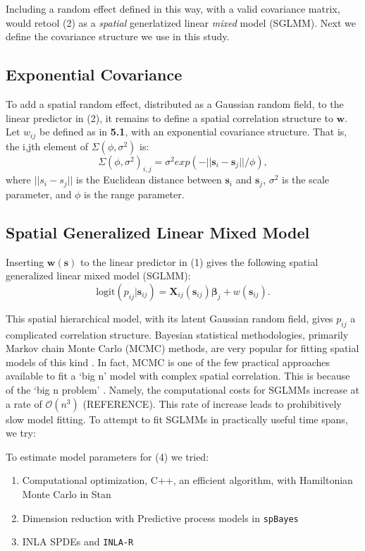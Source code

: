 \documentclass{article}
\begin{document}
Including a random effect defined in this way, with a valid covariance matrix, would retool (2) as a {\it spatial} generlatized linear {\it mixed} model (SGLMM). Next we define the covariance structure we use in this study.

\subsection{Exponential Covariance}
To add a spatial random effect, distributed as a Gaussian random field, to the linear predictor in (2), it remains to define a spatial correlation structure to $\pmb{w}$. Let $w_{ij}$ be defined as in {\bf 5.1}, with an exponential covariance structure. That is, the i,jth element of $\Sigma(\phi, \sigma^{2})$ is:
\begin{equation}
\Sigma(\phi, \sigma^{2})_{i,j} = \sigma^{2} exp(-||\pmb{s}_{i} - \pmb{s}_{j}||/\phi),
\end{equation}
where $||s_{i} - s_{j}||$ is the Euclidean distance between $\pmb{s}_{i}$ and $\pmb{s}_{j}$, $\sigma^{2}$ is the scale parameter, and $\phi$ is the range parameter.

\subsection{Spatial Generalized Linear Mixed Model}
Inserting $\pmb{w}(\pmb{s})$ to the linear predictor in (1) gives the following spatial generalized linear mixed model (SGLMM):
\begin{equation}
\text{logit}(p_{ij}|\pmb{s}_{ij}) = \pmb{X}_{ij}(\pmb{s}_{ij}) \pmb{\beta}_{j} + w(\pmb{s}_{ij}).
\end{equation}

This spatial hierarchical model, with its latent Gaussian random field, gives $p_{ij}$ a complicated correlation structure. Bayesian statistical methodologies, primarily Markov chain Monte Carlo (MCMC) methods, are very popular for fitting spatial models of this kind \citep{Banerjee2014}. In fact, MCMC is one of the few practical approaches available to fit a `big n' model with complex spatial correlation. This is because of the `big n problem' \citep{Lindgren2011}. Namely, the computational costs for SGLMMs increase at a rate of $\mathcal{O}(n^{3})$ (REFERENCE). This rate of increase leads to prohibitively slow model fitting. To attempt to fit SGLMMs in practically useful time spans, we try: 

To estimate model parameters for (4) we tried:
\begin{enumerate}
\item Computational optimization, C++, an efficient algorithm, with Hamiltonian Monte Carlo in Stan
\item Dimension reduction with Predictive process models in \verb|spBayes|
\item INLA SPDEs and \verb|INLA-R|
\end{enumerate}
\end{document}
